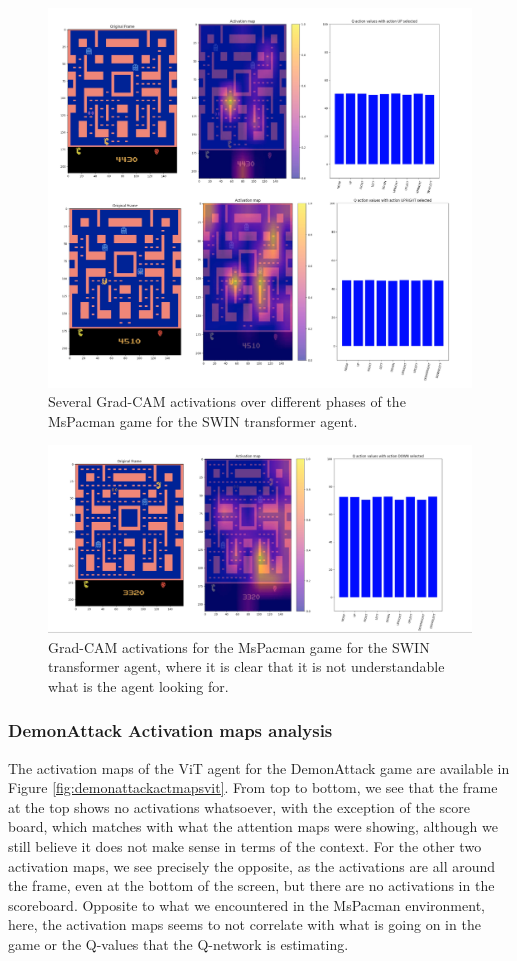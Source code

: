 \begin{figure}[!h]
	\centering
	\includegraphics[width=0.65\linewidth]{figures/swin_activation_maps_grad_cam_frame1}
	\caption{Several Grad-CAM activations over different phases of the MsPacman game for the SWIN transformer agent.}
	\label{fig:swinactivationmapsgradcamframe1}
\end{figure}

\begin{figure}[!h]
	\centering
	\includegraphics[width=0.65\linewidth]{figures/swin_activation_nonsense}
	\caption{Grad-CAM activations for the MsPacman game for the SWIN transformer agent, where it is clear that it is not understandable what is the agent looking for.}
	\label{fig:swinactivationnonsense}
\end{figure}

\subsubsection{DemonAttack Activation maps analysis}

The activation maps of the ViT agent for the DemonAttack game are available in Figure \ref{fig:demonattackactmapsvit}. From top to bottom, we see that the frame at the top shows no activations whatsoever, with the exception of the score board, which matches with what the attention maps were showing, although we still believe it does not make sense in terms of the context. For the other two activation maps, we see precisely the opposite, as the activations are all around the frame, even at the bottom of the screen, but there are no activations in the scoreboard. Opposite to what we encountered in the MsPacman environment, here, the activation maps seems to not correlate with what is going on in the game or the Q-values that the Q-network is estimating.

